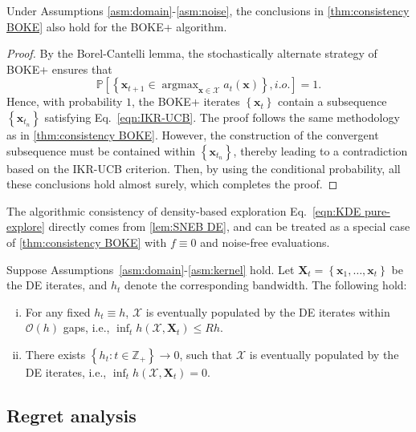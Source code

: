 \documentclass[11pt,en]{elegantpaper}
\newcommand{\domain}{\mathcal{X}}
\newcommand{\X}{\bm{X}}
\newcommand{\x}{\bm{x}}
\newcommand{\order}{\mathcal{O}}
\newcommand{\1}{\mathds{1}}
\newcommand{\set}[1]{\left\{#1\right\}}
\DeclareMathOperator*{\argmax}{argmax}
\begin{document}
\begin{corollary}
    \label{cor:consistency BOKE+}
    Under Assumptions \ref{asm:domain}-\ref{asm:noise}, the conclusions in \cref{thm:consistency BOKE} also hold for the BOKE+ algorithm.
\end{corollary}

\begin{proof}
    By the Borel-Cantelli lemma, the stochastically alternate strategy of BOKE+ ensures that
    \[
        \mathbb{P}\left[ \set{\x_{t+1} \in \argmax_{\x \in \domain} a_{t}(\x)}, i.o. \right] = 1.
    \]
    Hence, with probability $1$, the BOKE+ iterates $\set{\x_t}$ contain a subsequence $\set{\x_{t_n}}$ satisfying Eq.~\eqref{eqn:IKR-UCB}. 
    The proof follows the same methodology as in \cref{thm:consistency BOKE}. However, the construction of the convergent subsequence must be contained within $\set{\x_{t_n}}$, thereby leading to a contradiction based on the IKR-UCB criterion.
    Then, by using the conditional probability, all these conclusions hold almost surely, which completes the proof.
\end{proof}


The algorithmic consistency of density-based exploration Eq.~\eqref{eqn:KDE pure-explore} directly comes from \cref{lem:SNEB DE}, and can be treated as a special case of \cref{thm:consistency BOKE} with $f \equiv 0$ and noise-free evaluations.

\begin{corollary}
    \label{cor:consistency DE}
    Suppose Assumptions~\ref{asm:domain}-\ref{asm:kernel} hold. Let $\X_t = \set{\x_1, \dots, \x_t}$ be the DE iterates, and $h_t$ denote the corresponding bandwidth. The following hold:
    \begin{enumerate}[(i)]
        \item\label{it1:consistency DE} For any fixed $h_t \equiv h$, $\domain$ is eventually populated by the DE iterates within $\order(h)$ gaps, i.e., $\inf_t h(\domain, \X_t) \le R h$.
        
        \item\label{it2:consistency DE} There exists $\set{h_t : t \in \mathbb{Z}_+} \to 0$, such that $\domain$ is eventually populated by the DE iterates, i.e., $\inf_t h(\domain, \X_t) = 0$.
    \end{enumerate}
\end{corollary}




\subsection{Regret analysis}
\label{sec:regret analysis}
\end{document}
